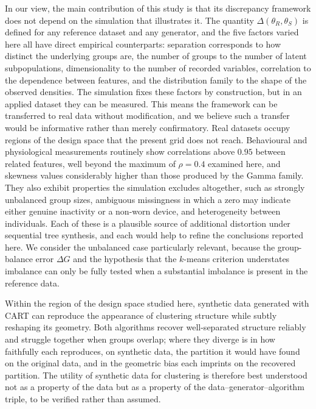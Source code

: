 \documentclass[pdflatex,sn-basic]{sn-jnl}
\begin{document}
In our view, the main contribution of this study is that its discrepancy
framework does not depend on the simulation that illustrates it. The quantity
$\Delta(\theta_R, \theta_S)$ is defined for any reference dataset and any
generator, and the five factors varied here all have direct empirical
counterparts: separation corresponds to how distinct the underlying groups
are, the number of groups to the number of latent subpopulations,
dimensionality to the number of recorded variables, correlation to the
dependence between features, and the distribution family to the shape of the
observed densities. The simulation fixes these factors by construction, but in
an applied dataset they can be measured. This means the framework can be
transferred to real data without modification, and we believe such a transfer
would be informative rather than merely confirmatory. Real datasets occupy
regions of the design space that the present grid does not reach. Behavioural
and physiological measurements routinely show correlations above $0.95$
between related features, well beyond the maximum of $\rho = 0.4$ examined
here, and skewness values considerably higher than those produced by the Gamma
family. They also exhibit properties the simulation excludes altogether, such
as strongly unbalanced group sizes, ambiguous missingness in which a zero may
indicate either genuine inactivity or a non-worn device, and heterogeneity
between individuals. Each of these is a plausible source of additional
distortion under sequential tree synthesis, and each would help to refine the
conclusions reported here. We consider the unbalanced case particularly
relevant, because the group-balance error $\Delta G$ and the hypothesis that
the $k$-means criterion understates imbalance can only be fully tested when a
substantial imbalance is present in the reference data.

Within the region of the design space studied here, synthetic data generated
with CART can reproduce the appearance of clustering structure while subtly
reshaping its geometry. Both algorithms recover well-separated structure
reliably and struggle together when groups overlap; where they diverge is in
how faithfully each reproduces, on synthetic data, the partition it would have
found on the original data, and in the geometric bias each imprints on the
recovered partition. The utility of synthetic data for clustering is therefore
best understood not as a property of the data but as a property of the
data--generator--algorithm triple, to be verified rather than assumed.
\end{document}
